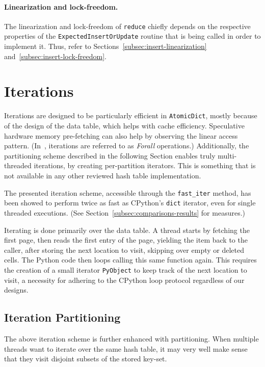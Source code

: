 \paragraph{Linearization and lock-freedom.}
The linearization and lock-freedom of \texttt{reduce} chiefly depends on the respective properties of the \texttt{ExpectedInsertOr\-Update} routine that is being called in order to implement it.
Thus, refer to Sections~\ref{subsec:insert-linearization} and~\ref{subsec:insert-lock-freedom}.


\section{Iterations}\label{sec:iterations}

Iterations are designed to be particularly efficient in \texttt{AtomicDict}, mostly because of the design of the data table, which helps with cache efficiency.
Speculative hardware memory pre-fetching can also help by observing the linear access pattern.
(In~\cite{maier}, iterations are referred to as \emph{Forall} operations.)
Additionally, the partitioning scheme described in the following Section enables truly multi-threaded iterations, by creating per-partition iterators.
This is something that is not available in any other reviewed hash table implementation.

The presented iteration scheme, accessible through the \texttt{{fast\_iter}} method, has been showed to perform twice as fast as CPython's \texttt{dict} iterator, even for single threaded executions.
(See Section~\ref{subsec:comparisons-results} for measures.)

Iterating is done primarily over the data table.
A thread starts by fetching the first page, then reads the first entry of the page, yielding the item back to the caller, after storing the next location to visit, skipping over empty or deleted cells.
The Python code then loops calling this same function again.
This requires the creation of a small iterator \texttt{PyObject} to keep track of the next location to visit, a necessity for adhering to the CPython loop protocol regardless of our designs.

\subsection{Iteration Partitioning}\label{subsec:iteration-partitioning}

The above iteration scheme is further enhanced with partitioning.
When multiple threads want to iterate over the same hash table, it may very well make sense that they visit disjoint subsets of the stored key-set.

